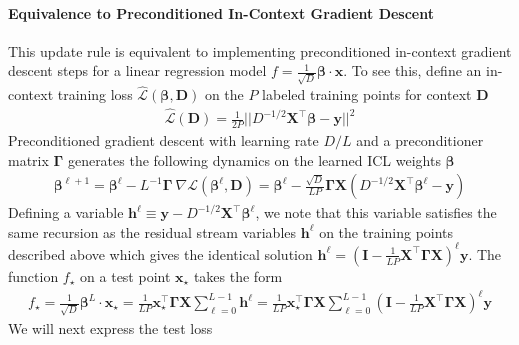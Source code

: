 \documentclass{article} %
\def\x{\bm x}
\def\h{\bm h}
\begin{document}
\paragraph{Equivalence to Preconditioned In-Context Gradient Descent} This update rule is equivalent to implementing preconditioned in-context gradient descent steps for a linear regression model $f = \frac{1}{\sqrt D} \bm\beta \cdot \bm x$. To see this, define an in-context training loss $\hat{\mathcal L}(\bm\beta, \bm D)$ on the $P$ labeled training points for context $\bm D$
\begin{align}
    \hat{\mathcal L}(\bm D) = \frac{1}{2 P} || D^{-1/2} \bm X^\top \bm\beta  - \bm y ||^2 
\end{align}
Preconditioned gradient descent with learning rate $D/L$ and a preconditioner matrix $\bm \Gamma$ generates the following dynamics on the learned ICL weights $\bm \beta$
\begin{align}
    \bm\beta^{\ell+1} = \bm\beta^\ell - L^{-1} \bm\Gamma  \ \nabla  \mathcal L(\bm \beta^\ell,\bm D) =  \bm\beta^\ell -  \frac{\sqrt D}{L P} \bm \Gamma \bm X \left( D^{-1/2} \bm X^\top \bm \beta^\ell - \bm y \right)
\end{align}
Defining a variable $\bm h^\ell \equiv \bm y - D^{-1/2} \bm X^\top \bm\beta^\ell$, we note that this variable satisfies the same recursion as the residual stream variables $\bm h^\ell$ on the training points described above which gives the identical solution $\h^\ell = \left( \bm I -   \frac{1}{LP} \bm X^\top \bm \Gamma \bm X \right)^\ell \bm y$. The function $f_\star$ on a test point $\x_\star$ takes the form
\begin{align}
    f_\star = \frac{1}{\sqrt D} \bm \beta^L \cdot \bm x_\star =  \frac{1}{L P } \bm x_\star^\top \bm\Gamma \bm X \sum_{\ell=0}^{L-1}  \bm h^\ell = \frac{1}{L P} \bm x_\star^\top \bm\Gamma \bm X \sum_{\ell=0}^{L-1}  \left( \bm I -   \frac{1}{L P} \bm X^\top \bm \Gamma \bm X \right)^\ell \bm y
\end{align}
We will next express the test loss 
\end{document}
